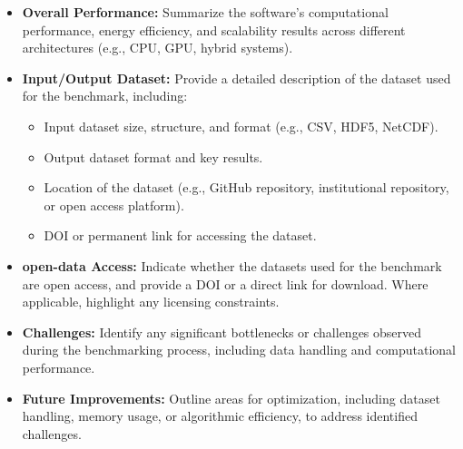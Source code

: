 \begin{itemize}
    \item \textbf{Overall Performance:} Summarize the software's computational performance, energy efficiency, and scalability results across different architectures (e.g., CPU, GPU, hybrid systems).
    \item \textbf{Input/Output Dataset:} Provide a detailed description of the dataset used for the benchmark, including:
        \begin{itemize}
            \item Input dataset size, structure, and format (e.g., CSV, HDF5, NetCDF).
            \item Output dataset format and key results.
            \item Location of the dataset (e.g., GitHub repository, institutional repository, or open access platform).
            \item DOI or permanent link for accessing the dataset.
        \end{itemize}
    \item \textbf{open-data Access:} Indicate whether the datasets used for the benchmark are open access, and provide a DOI or a direct link for download. Where applicable, highlight any licensing constraints.
    \item \textbf{Challenges:} Identify any significant bottlenecks or challenges observed during the benchmarking process, including data handling and computational performance.
    \item \textbf{Future Improvements:} Outline areas for optimization, including dataset handling, memory usage, or algorithmic efficiency, to address identified challenges.
\end{itemize}

